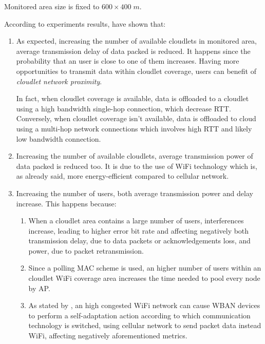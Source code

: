 \documentclass[sigchi]{acmart}
\begin{document}
Monitored area size is fixed to $600 \times 400\;m$.

According to experiments results, \citet{MSAReport} have shown that:

\begin{enumerate}

\item As expected, increasing the number of available cloudlets in monitored area, average transmission delay of data packed is reduced. It happens since the probability  that an user is close to one of them increases. Having more opportunities to transmit data within cloudlet coverage, users can benefit of \textit{cloudlet network proximity}. 

In fact, when cloudlet coverage is available, data is offloaded to a cloudlet using a high bandwidth single-hop connection, which decrease RTT. Conversely, when cloudlet coverage isn't available, data is offloaded to cloud using a multi-hop network connections which involves high RTT and likely low bandwidth connection.\cite{ArchitecturalTacticsCyberForaging}

\item Increasing the number of available cloudlets, average transmission power of data packed is reduced too. It is due to the use of WiFi technology which is, as already said, more energy-efficient compared to cellular network.

\item Increasing the number of users, both average transmission power and delay increase. This happens because:

\begin{enumerate}
\item When a cloudlet area contains a large number of users, interferences increase, leading to higher error bit rate and affecting negatively both transmission delay, due to data packets or acknowledgements loss, and power, due to packet retransmission.

\item Since a polling MAC scheme is used, an higher number of users within an cloudlet WiFi coverage area increases the time needed to pool every node by AP. 

\item As stated by \citet{MSAReport}, an high congested WiFi network can cause WBAN devices to perform a self-adaptation action according to which communication technology is switched, using cellular network to send packet data instead WiFi, affecting negatively aforementioned metrics.
\end{enumerate}

\end{enumerate}
\end{document}

